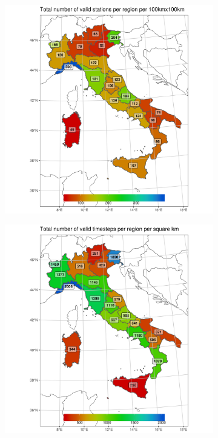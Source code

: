 \begin{figure}
\begin{subfigure}{.475\textwidth}
    \end{subfigure}\\
    \begin{subfigure}{.475\textwidth}
        \caption{}\label{fig:regional_stats/e}
        \includegraphics[width=\textwidth]{figures/rain_dst/regional_stats/plot5.png}
    \end{subfigure}
    \begin{subfigure}{.475\textwidth}
        \caption{}\label{fig:regional_stats/f}
        \includegraphics[width=\textwidth]{figures/rain_dst/regional_stats/plot6.png}

\end{subfigure}
\end{figure}

